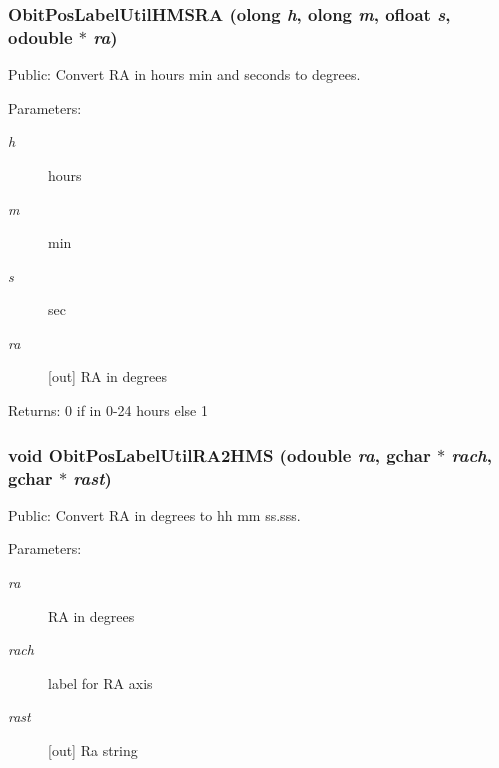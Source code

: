 \subsubsection{ Obit\-Pos\-Label\-Util\-HMSRA ({\bf olong} {\em h}, {\bf olong} {\em m}, {\bf ofloat} {\em s}, {\bf odouble} $\ast$ {\em ra})}\label{ObitPosLabelUtil_8h_a5}


Public: Convert RA in hours min and seconds to degrees. 

\begin{Desc}
\item[Parameters:]
\begin{description}
\item[{\em h}]hours \item[{\em m}]min \item[{\em s}]sec \item[{\em ra}][out] RA in degrees \end{description}
\end{Desc}
\begin{Desc}
\item[Returns:]0 if in 0-24 hours else 1 \end{Desc}
\subsubsection{\setlength{\rightskip}{0pt plus 5cm}void Obit\-Pos\-Label\-Util\-RA2HMS ({\bf odouble} {\em ra}, gchar $\ast$ {\em rach}, gchar $\ast$ {\em rast})}\label{ObitPosLabelUtil_8h_a1}


Public: Convert RA in degrees to hh mm ss.sss. 

\begin{Desc}
\item[Parameters:]
\begin{description}
\item[{\em ra}]RA in degrees \item[{\em rach}]label for RA axis \item[{\em rast}][out] Ra string \end{description}
\end{Desc}
